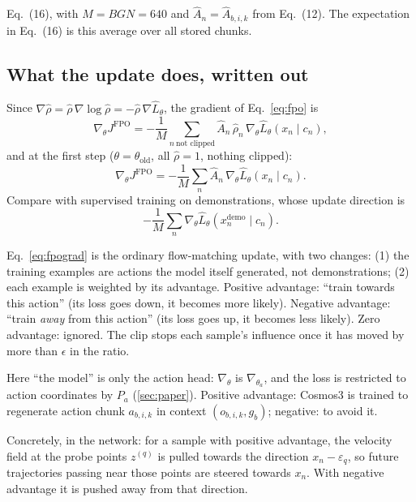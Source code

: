 \documentclass[11pt,a4paper]{article}
\newcommand{\Ah}{\hat A}
\newcommand{\Lh}{\hat L}
\begin{document}
\begin{paperlink}
Eq.~(16), with $M=BGN=640$ and $\Ah_n=\Ah_{b,i,k}$ from Eq.~(12). The expectation in Eq.~(16) is this average over all stored chunks.
\end{paperlink}

\subsection{What the update does, written out}
Since $\nabla\hat\rho=\hat\rho\,\nabla\log\hat\rho=-\hat\rho\,\nabla\Lh_\theta$, the gradient of Eq.~\eqref{eq:fpo} is
\begin{equation}
\nabla_\theta J^{\mathrm{FPO}}=-\frac1M\sum_{n\ \text{not clipped}}\Ah_n\,\hat\rho_n\,\nabla_\theta\Lh_\theta(x_n\mid c_n),
\end{equation}
and at the first step ($\theta=\theta_{\mathrm{old}}$, all $\hat\rho=1$, nothing clipped):
\begin{equation}
\nabla_\theta J^{\mathrm{FPO}}=-\frac1M\sum_n\Ah_n\,\nabla_\theta\Lh_\theta(x_n\mid c_n).
\label{eq:fpograd}
\end{equation}
Compare with supervised training on demonstrations, whose update direction is
\[
-\frac1M\sum_n\nabla_\theta\Lh_\theta(x^{\mathrm{demo}}_n\mid c_n).
\]

\begin{intuition}
Eq.~\eqref{eq:fpograd} is the ordinary flow-matching update, with two changes: (1) the training examples are actions the model itself generated, not demonstrations; (2) each example is weighted by its advantage. Positive advantage: ``train towards this action'' (its loss goes down, it becomes more likely). Negative advantage: ``train \emph{away} from this action'' (its loss goes up, it becomes less likely). Zero advantage: ignored. The clip stops each sample's influence once it has moved by more than $\epsilon$ in the ratio.
\end{intuition}

\begin{paperlink}
Here ``the model'' is only the action head: $\nabla_\theta$ is $\nabla_{\theta_a}$, and the loss is restricted to action coordinates by $P_a$ (\cref{sec:paper}). Positive advantage: Cosmos3 is trained to regenerate action chunk $a_{b,i,k}$ in context $(o_{b,i,k},g_b)$; negative: to avoid it.
\end{paperlink}

Concretely, in the network: for a sample with positive advantage, the velocity field at the probe points $z^{(q)}$ is pulled towards the direction $x_n-\varepsilon_q$, so future trajectories passing near those points are steered towards $x_n$. With negative advantage it is pushed away from that direction.
\end{document}

